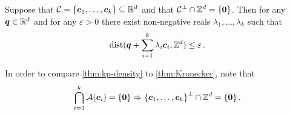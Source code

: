 \begin{theorem}
\label{thm:kp-density}
Suppose that $\mathcal{C} = \lbrace \boldsymbol{c}_{1}, \ldots, \boldsymbol{c}_{k} \rbrace \subseteq \mathbb{R}^{d}$ and that $\mathcal{C}^{\perp} \cap \mathbb{Z}^{d} = \lbrace \boldsymbol{0} \rbrace$. Then for any $\boldsymbol{q} \in \mathbb{R}^{d}$
and for any $\varepsilon > 0$ there exist non-negative reals $\lambda_{1}, \ldots, \lambda_{k}$ such that
\begin{equation*}
  \operatorname{dist}(\boldsymbol{q} + \sum\limits_{i=1}^{k} \lambda_{i} \boldsymbol{c}_{i}, \mathbb{Z}^{d}) \leq \varepsilon \, .
\end{equation*}
\end{theorem}
In order to compare \cref{thm:kp-density} to \cref{thm:Kronecker}, note that
\begin{equation*}
  \bigcap\limits_{i=1}^{k} {\mathcal{A}}(\boldsymbol{c}_{i}) = \lbrace \boldsymbol{0} \rbrace
  \Rightarrow {\lbrace \boldsymbol{c}_{1}, \ldots, \boldsymbol{c}_{k} \rbrace}^{\perp} \cap \mathbb{Z}^{d} = \lbrace \boldsymbol{0} \rbrace \, .
\end{equation*}
